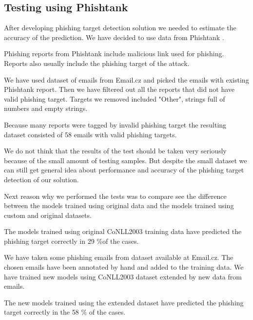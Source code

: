 \documentclass[thesis=B,english]{FITthesis}[2012/10/20]
\begin{document}
\subsection{Testing using Phishtank}
After developing phishing target detection solution we needed to estimate the accuracy of the prediction. We have decided to use data from Phishtank \cite{phishtank}. 
\par Phishing reports from Phishtank include malicious link used for phishing. Reports also usually include the phishing target of the attack. 
\par We have used dataset of emails from Email.cz and picked the emails with existing Phishtank report. 
Then we have filtered out all the reports that did not have valid phishing target. Targets we removed included "Other", strings full of numbers and empty strings. 
\par Because many reports were tagged by invalid phishing target the resulting dataset consisted of 58 emails with valid phishing targets. 
\par We do not think that the results of the test should be taken very seriously because of the small amount of testing samples. But despite the small dataset we can still get general idea about performance and accuracy of the phishing target detection of our solution. 

\par Next reason why we performed the tests was to compare see the difference between the models trained using original data and the models trained using custom and original datasets.

\par The models trained using original CoNLL2003 training data have predicted the phishing target correctly in 29 \%of the cases.
\par We have taken some phishing emails from dataset available at Email.cz. The chosen emails have been annotated by hand and added to the training data. We have trained new models using CoNLL2003 dataset extended by new data from emails.
\par The new models trained using the extended dataset have predicted the phishing target correctly in the 58 \% of the cases.
\end{document}
